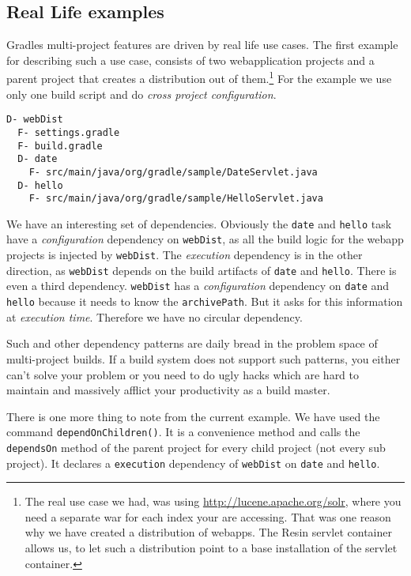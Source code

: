 \subsection{Real Life examples} %
\label{sub:real_life_examples}
Gradles multi-project features are driven by real life use cases. The first example for describing such a use case, consists of two webapplication projects and a parent project that creates a distribution out of them.\footnote{The real use case we had, was using \url{http://lucene.apache.org/solr}, where you need a separate war for each index your are accessing. That was one reason why we have created a distribution of webapps. The Resin servlet container allows us, to let such a distribution point to a base installation of the servlet container.} For the example we use only one build script and do \emph{cross project configuration}.
\begin{Verbatim}[frame=single,label=Project Tree]
D- webDist
  F- settings.gradle
  F- build.gradle
  D- date
    F- src/main/java/org/gradle/sample/DateServlet.java
  D- hello
    F- src/main/java/org/gradle/sample/HelloServlet.java
\end{Verbatim}
We have an interesting set of dependencies. Obviously the \texttt{date} and \texttt{hello} task have a \emph{configuration} dependency on \texttt{webDist}, as all the build logic for the webapp projects is injected by \texttt{webDist}. The \emph{execution} dependency is in the other direction, as \texttt{webDist} depends on the build artifacts of \texttt{date} and \texttt{hello}. There is even a third dependency. \texttt{webDist} has a \emph{configuration} dependency on \texttt{date} and \texttt{hello} because it needs to know the \texttt{archivePath}. But it asks for this information at \emph{execution time}. Therefore we have no circular dependency.

Such and other dependency patterns are daily bread in the problem space of multi-project builds. If a build system does not support such patterns, you either can't solve your problem or you need to do ugly hacks which are hard to maintain and massively afflict your productivity as a build master.

There is one more thing to note from the current example. We have used the command \texttt{dependOnChildren()}. It is a convenience method and calls the \texttt{dependsOn} method of the parent project for every child project (not every sub project). It declares a \texttt{execution} dependency of \texttt{webDist} on \texttt{date} and \texttt{hello}.

